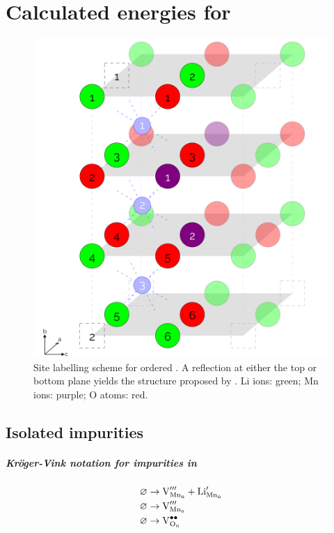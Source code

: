 \chapter{Calculated energies for }

\begin{figure}[h]
\centering
\includegraphics[height = 0.5\textheight]{figures/orderedlabels/orderedlabels}
\caption[Repetition of Figure \ref{fig:orderedlabel} for convenience]{Site labelling scheme for ordered . A reflection at either the top or bottom plane yields the structure proposed by \citet{Diaz-Lopez2017}. Li ions: green; Mn ions: purple; O atoms: red.
}
\end{figure}

\newpage
\newpage
\section{Isolated impurities}
\paragraph{{\color{red}Kr\"oger-Vink notation for impurities in }}

\begin{align}
\varnothing &\rightarrow \ce{V^{\prime \prime \prime}_{Mn_n}} + \ce{Li^\prime_{Mn_n}} \\
\varnothing &\rightarrow \ce{V^{\prime \prime \prime}_{Mn_n}}\\
\varnothing &\rightarrow \ce{V^{\bullet\bullet}_{O_n}}
\end{align}

